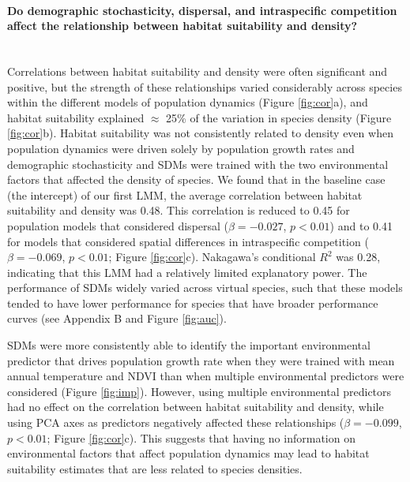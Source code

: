 \paragraph*{Do demographic stochasticity, dispersal, and intraspecific competition affect the relationship between habitat suitability and density?}\mbox{}\\
Correlations between habitat suitability and density were often significant and positive, but the strength of these relationships varied considerably across species within the different models of population dynamics (Figure \ref{fig:cor}a), and habitat suitability explained $\approx$ 25\% of the variation in species density (Figure \ref{fig:cor}b). Habitat suitability was not consistently related to density even when population dynamics were driven solely by population growth rates and demographic stochasticity and SDMs were trained with the two environmental factors that affected the density of species. We found that in the baseline case (the intercept) of our first LMM, the average correlation between habitat suitability and density was 0.48. This correlation is reduced to 0.45 for population models that considered dispersal ($\beta = -0.027$, $p < 0.01$) and to 0.41 for models that considered spatial differences in intraspecific competition ($\beta = -0.069$, $p < 0.01$; Figure \ref{fig:cor}c). Nakagawa's conditional $R^2$ was 0.28, indicating that this LMM had a relatively limited explanatory power. The performance of SDMs widely varied across virtual species, such that these models tended to have lower performance for species that have broader performance curves (see Appendix B and Figure \ref{fig:auc}).


SDMs were more consistently able to identify the important environmental predictor that drives population growth rate when they were trained with mean annual temperature and NDVI than when multiple environmental predictors were considered (Figure \ref{fig:imp}). However, using multiple environmental predictors had no effect on the correlation between habitat suitability and density, while using PCA axes as predictors negatively affected these relationships ($\beta = -0.099$, $p < 0.01$; Figure \ref{fig:cor}c). This suggests that having no information on environmental factors that affect population dynamics may lead to habitat suitability estimates that are less related to species densities.


